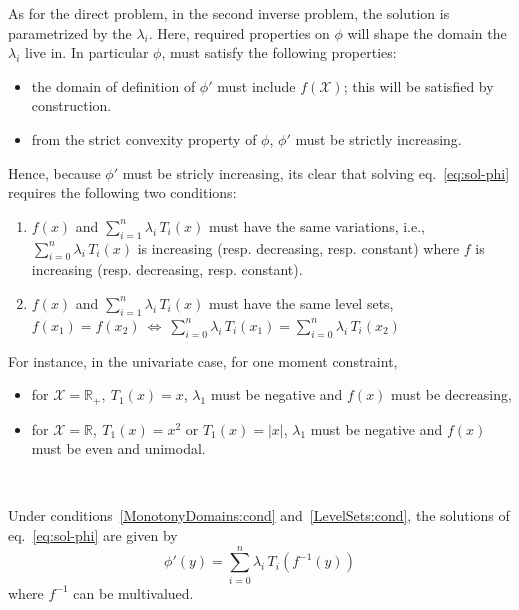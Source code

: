 \documentclass[english,sort&compress]{elsarticle}
\theoremstyle{definition}
\theoremstyle{plain}
\theoremstyle{plain}
\def\Rset{\mathbb{R}}
\def\X{\mathcal{X}}
\begin{document}
As  for the  direct problem,  in  the second  inverse problem,  the solution  is
parametrized by the $\lambda_i$. Here,  required properties on $\phi$ will shape
the  domain the  $\lambda_i$ live  in. In  particular $\phi$,  must satisfy  the
following properties:
%
\begin{itemize}
\item the  domain of definition  of $\phi'$ must  include $f(\X)$; this  will be
  satisfied by construction.
%
\item from  the strict  convexity property of  $\phi$, $\phi'$ must  be strictly
  increasing.
\end{itemize}
%
Hence,  because $\phi'$  must  be  stricly increasing,  its  clear that  solving
eq.~\eqref{eq:sol-phi}  requires the following two conditions:
%
\begin{enumerate}[label=(C\arabic*)]
\item\label{MonotonyDomains:cond}   $f(x)$   and   $\displaystyle   \sum_{i=1}^n
  \lambda_i  \, T_i(x)$  must  have the  same  variations, i.e.,  $\displaystyle
  \sum_{i=0}^n   \lambda_i  \,   T_i(x)$  is   increasing  (resp.    decreasing,
  resp. constant) where $f$ is increasing (resp. decreasing, resp. constant).
%
\item\label{LevelSets:cond} $f(x)$ and  $\displaystyle \sum_{i=1}^n \lambda_i \,
  T_i(x)$ must have the same level  sets, $f(x_1) = f(x_2) \: \Leftrightarrow \:
  \displaystyle \sum_{i=0}^n  \lambda_i \, T_i(x_1) =  \sum_{i=0}^n \lambda_i \,
  T_i(x_2)$
\end{enumerate}
%
For instance, in the univariate case, for one moment constraint, %
%
\begin{itemize}
\item for $\X = \Rset_+, \: T_1(x) = x$, $\lambda_1$ must be negative and $f(x)$
  must be decreasing,
%
\item for $\X = \Rset, \: T_1(x) = x^2$ or $T_1(x) = |x|$, $\lambda_1$ must be
  negative and $f(x)$ must be even and unimodal.
\end{itemize}

\

Under  conditions~\ref{MonotonyDomains:cond} and~\ref{LevelSets:cond}, the
solutions of eq.~\eqref{eq:sol-phi} are given by
%
\begin{equation}\label{eq:derivative-phi}
\phi'(y) = \sum_{i=0}^n \lambda_i \, T_i\!\left(f^{-1}(y)\right)
\end{equation}
%
where $f^{-1}$ can be multivalued.
\end{document}
